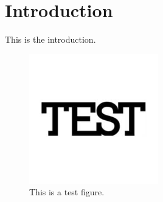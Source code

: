 \section{Introduction}
\label{sec:Introduction}
This is the introduction.

\begin{figure}[!htb]
\begin{center}
\includegraphics[width=0.5\textwidth]{./Figures/Test.jpg}
\caption{This is a test figure.
}
\label{fig:Test} 
\end{center}
\end{figure}